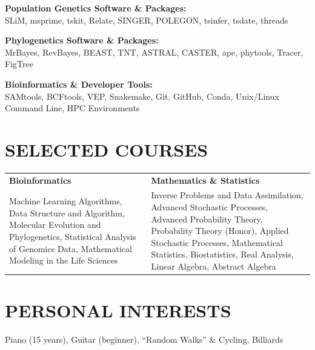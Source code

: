 \documentclass[a4paper,10pt]{extarticle}
\begin{document}
\vspace{3pt} %

\noindent
\textbf{Population Genetics Software \& Packages:} \\
SLiM, msprime, tskit, Relate, SINGER, POLEGON, tsinfer, tsdate, threads

\vspace{3pt}

\noindent
\textbf{Phylogenetics Software \& Packages:} \\
MrBayes, RevBayes, BEAST, TNT, ASTRAL, CASTER, ape, phytools, Tracer, FigTree

\vspace{3pt}

\noindent
\textbf{Bioinformatics \& Developer Tools:} \\
SAMtools, BCFtools, VEP, Snakemake, Git, GitHub, Conda, Unix/Linux Command Line, HPC Environments

\section*{SELECTED COURSES}
\begin{tabularx}{\textwidth}{@{}XX@{}}
\textbf{Bioinformatics} & \textbf{Mathematics \& Statistics} \\
Machine Learning Algorithms, Data Structure and Algorithm, Molecular Evolution and Phylogenetics, Statistical Analysis of Genomics Data, Mathematical Modeling in the Life Sciences
&
Inverse Problems and Data Assimilation, Advanced Stochastic Processes, Advanced Probability Theory, Probability Theory (Honor), Applied Stochastic Processes, Mathematical Statistics, Biostatistics, Real Analysis, Linear Algebra, Abstract Algebra \\
\end{tabularx}

\section*{PERSONAL INTERESTS}
\noindent
Piano (15 years), Guitar (beginner),  ``Random Walks'' \& Cycling, Billiards
\end{document}
